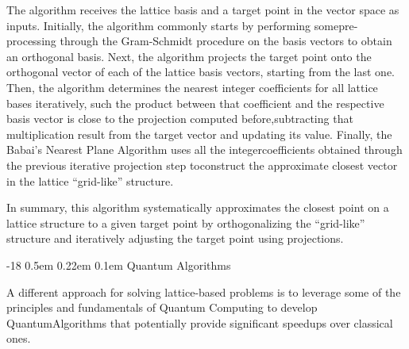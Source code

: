 \documentclass[runningheads]{llncs}
\makeatletter
\renewcommand\subsubsection{\@startsection{subsubsection}{3}{\z@}%
                       {-18\p@ \@plus -4\p@ \@minus -4\p@}%
                       {0.5em \@plus 0.22em \@minus 0.1em}%
                       {\normalfont\normalsize\bfseries\boldmath}}
\numberwithin{equation}{section}
\makeatother
\begin{document}
\begin{enumerate}
        The algorithm receives the lattice basis and a target point in the vector space as inputs. Initially, the algorithm commonly starts by performing some\break pre-processing through the Gram-Schmidt procedure on the basis vectors to obtain an orthogonal basis. Next, the algorithm projects the target point onto the orthogonal vector of each of the lattice basis vectors, starting from the last one. Then, the algorithm determines the nearest integer coefficients for all lattice bases iteratively, such the product between that coefficient and the respective basis vector is close to the projection computed before,\break subtracting that multiplication result from the target vector and updating its value. Finally, the Babai's Nearest Plane Algorithm uses all the integer\break coefficients obtained through the previous iterative projection step to\break construct the approximate closest vector in the lattice ``grid-like'' structure.
        
        In summary, this algorithm systematically approximates the closest point on a lattice structure to a given target point by orthogonalizing the ``grid-like'' structure and iteratively adjusting the target point using projections.
    \end{enumerate}

    \subsubsection{Quantum Algorithms}
    \label{subsubsec:quantum-algorithms}

    A different approach for solving lattice-based problems is to leverage some of the principles and fundamentals of Quantum Computing to develop Quantum\break Algorithms that potentially provide significant speedups over classical ones.    
    
\end{document}
